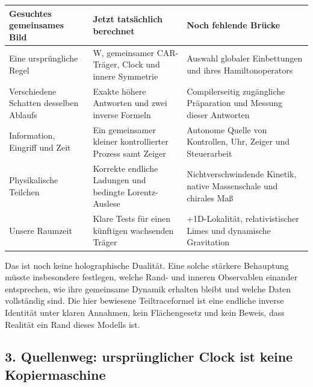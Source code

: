 {\def\LTcaptype{none} %
\begin{longtable}[]{@{}
  >{\raggedright\arraybackslash}p{}
  >{\raggedright\arraybackslash}p{}
  >{\raggedright\arraybackslash}p{}@{}}
\toprule\noalign{}
\begin{minipage}[b]{\linewidth}\raggedright
Gesuchtes gemeinsames Bild
\end{minipage} & \begin{minipage}[b]{\linewidth}\raggedright
Jetzt tatsächlich berechnet
\end{minipage} & \begin{minipage}[b]{\linewidth}\raggedright
Noch fehlende Brücke
\end{minipage} \\
\midrule\noalign{}
\endhead
\bottomrule\noalign{}
\endlastfoot
Eine ursprüngliche Regel & W, gemeinsamer CAR-Träger, Clock und innere
Symmetrie & Auswahl globaler Einbettungen und ihres Hamiltonoperators \\
Verschiedene Schatten desselben Ablaufs & Exakte höhere Antworten und
zwei inverse Formeln & Compilerseitig zugängliche Präparation und
Messung dieser Antworten \\
Information, Eingriff und Zeit & Ein gemeinsamer kleiner kontrollierter
Prozess samt Zeiger & Autonome Quelle von Kontrollen, Uhr, Zeiger und
Steuerarbeit \\
Physikalische Teilchen & Korrekte endliche Ladungen und bedingte
Lorentz-Auslese & Nichtverschwindende Kinetik, native Massenschale und
chirales Maß \\
Unsere Raumzeit & Klare Tests für einen künftigen wachsenden Träger &
3+1D-Lokalität, relativistischer Limes und dynamische Gravitation \\
\end{longtable}
}

Das ist noch keine holographische Dualität. Eine solche stärkere
Behauptung müsste insbesondere festlegen, welche Rand- und inneren
Observablen einander entsprechen, wie ihre gemeinsame Dynamik erhalten
bleibt und welche Daten vollständig sind. Die hier bewiesene
Teiltraceformel ist eine endliche inverse Identität unter klaren
Annahmen, kein Flächengesetz und kein Beweis, dass Realität ein Rand
dieses Modells ist.

\subsection{3. Quellenweg: ursprünglicher Clock ist keine
Kopiermaschine}\label{quellenweg-urspruxfcnglicher-clock-ist-keine-kopiermaschine}

